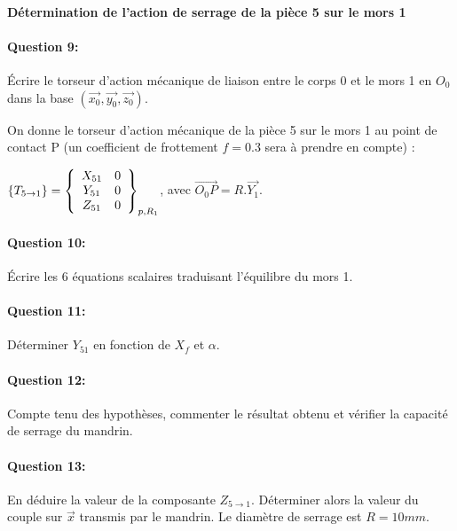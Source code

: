 ~\

\textbf{Détermination de l'action de serrage de la pièce 5 sur le mors 1}

\paragraph{Question 9:} Écrire le torseur d'action mécanique de liaison entre le corps 0 et le mors 1 en $O_0$ dans la base $(\overrightarrow{x_0},\overrightarrow{y_0},\overrightarrow{z_0})$. 

On donne le torseur d'action mécanique de la pièce 5 sur le mors 1 au point de contact P (un coefficient de frottement $f=0.3$ sera à prendre en compte) : 

$\left\{T_{5 \rightarrow 1}\right\}=\left\{
  \begin{array}{c c}
  X_{51} & 0 \\
  Y_{51} & 0 \\
  Z_{51} & 0
  \end{array}\right\}_{p,R_1}$, avec $\overrightarrow{O_0P}=R.\overrightarrow{Y_1}$.

\paragraph{Question 10:} Écrire les 6 équations scalaires traduisant l'équilibre du mors 1. 

\paragraph{Question 11:} Déterminer $Y_{51}$ en fonction de $X_f$ et $\alpha$. 

\paragraph{Question 12:} Compte tenu des hypothèses, commenter le résultat obtenu et vérifier la capacité de serrage du mandrin.

\paragraph{Question 13:} En déduire la valeur de la composante $Z_{5 \rightarrow 1}$. Déterminer alors la valeur du couple sur $\overrightarrow{x}$ transmis par le mandrin. Le diamètre de serrage est $R=10mm$.

